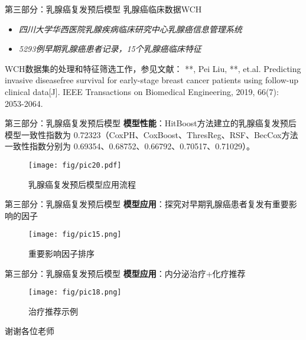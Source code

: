 \documentclass[10pt]{beamer}
\begin{document}
\begin{frame}{第三部分：乳腺癌复发预后模型}
  乳腺癌临床数据WCH
  \begin{itemize}
    \item \textit{四川大学华西医院乳腺疾病临床研究中心乳腺癌信息管理系统}
    \item \textit{5293例早期乳腺癌患者记录，15个乳腺癌临床特征}
  \end{itemize}

  WCH数据集的处理和特征筛选工作，参见文献： **, Pei Liu, **, et.al. Predicting invasive disease­free survival for early-stage breast cancer patients using follow­-up clinical data[J]. IEEE Transactions on Biomedical Engineering, 2019, 66(7): 2053­-2064.
\end{frame}

\begin{frame}{第三部分：乳腺癌复发预后模型}
  \textbf{模型性能}：HitBoost方法建立的乳腺癌复发预后模型一致性指数为 0.72323（CoxPH、CoxBoost、ThresReg、RSF、BecCox方法一致性指数分别为 0.69354、0.68752、0.66792、0.70517、0.71029）。

  \begin{figure}[H]
    \centering
    \texttt{[image: fig/pic20.pdf]}
    \caption{乳腺癌复发预后模型应用流程}
  \end{figure}
\end{frame}

\begin{frame}{第三部分：乳腺癌复发预后模型}
  \textbf{模型应用}：探究对早期乳腺癌患者复发有重要影响的因子
  \begin{figure}[H]
    \centering
    \texttt{[image: fig/pic15.png]}
    \caption{重要影响因子排序}
  \end{figure}
\end{frame}

\begin{frame}{第三部分：乳腺癌复发预后模型}
  \textbf{模型应用}：内分泌治疗+化疗推荐
  \begin{figure}[H]
    \centering
    \texttt{[image: fig/pic18.png]}
    \caption{治疗推荐示例}
  \end{figure}
\end{frame}

\begin{frame}[standout]
  谢谢各位老师
\end{frame}
\end{document}
